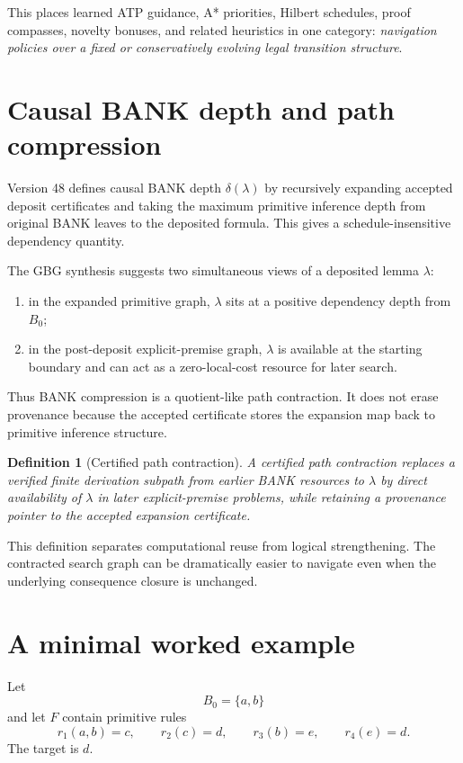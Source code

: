 \documentclass[11pt]{article}
\newtheorem{definition}{Definition}[section]
\theoremstyle{remark}
\begin{document}
This places learned ATP guidance, A* priorities, Hilbert schedules, proof compasses, novelty bonuses, and related heuristics in one category: \emph{navigation policies over a fixed or conservatively evolving legal transition structure}.

\section{Causal BANK depth and path compression}

Version 48 defines causal BANK depth $\delta(\lambda)$ by recursively expanding accepted deposit certificates and taking the maximum primitive inference depth from original BANK leaves to the deposited formula. This gives a schedule-insensitive dependency quantity.

The GBG synthesis suggests two simultaneous views of a deposited lemma $\lambda$:
\begin{enumerate}[leftmargin=2em]
\item in the expanded primitive graph, $\lambda$ sits at a positive dependency depth from $B_0$;
\item in the post-deposit explicit-premise graph, $\lambda$ is available at the starting boundary and can act as a zero-local-cost resource for later search.
\end{enumerate}

Thus BANK compression is a quotient-like path contraction. It does not erase provenance because the accepted certificate stores the expansion map back to primitive inference structure.

\begin{definition}[Certified path contraction]
A certified path contraction replaces a verified finite derivation subpath from earlier BANK resources to $\lambda$ by direct availability of $\lambda$ in later explicit-premise problems, while retaining a provenance pointer to the accepted expansion certificate.
\end{definition}

This definition separates computational reuse from logical strengthening. The contracted search graph can be dramatically easier to navigate even when the underlying consequence closure is unchanged.

\section{A minimal worked example}

Let
\[
B_0=\{a,b\}
\]
and let $F$ contain primitive rules
\[
r_1(a,b)=c,
\qquad
r_2(c)=d,
\qquad
r_3(b)=e,
\qquad
r_4(e)=d.
\]
The target is $d$.
\end{document}
